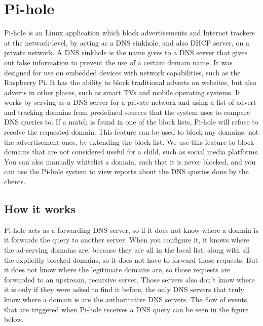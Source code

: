 \section{Pi-hole}

Pi-hole is an Linux application which block advertisements and Internet trackers at the network-level, by acting as a DNS sinkhole, and also DHCP server, on a private network. A DNS sinkhole is the name gives to a DNS server that gives out false information to prevent the use of a certain domain name. It was designed for use on embedded devices with network capabilities, such as the Raspberry Pi. It has the ability to block traditional adverts on websites, but also adverts in other places, such as smart TVs and mobile operating systems. It works by serving as a DNS server for a private network and using a list of advert and tracking domains from predefined sources that the system uses to compare DNS queries to. \parencite{salmela2015pihole} If a match is found in one of the block lists, Pi-hole will refuse to resolve the requested domain. This feature can be used to block any domains, not the advertisement ones, by extending the block list. We use this feature to block domains that are not considered useful for a child, such as social media platforms. You can also manually whitelist a domain, such that it is never blocked, and you can use the Pi-hole system to view reports about the DNS queries done by the clients.

\subsection{How it works}

Pi-hole acts as a forwarding DNS server, so if it does not know where a domain is it forwards the query to another server. When you configure it, it knows where the ad-serving domains are, because they are all in the local list, along with all the explicitly blocked domains, so it does not have to forward those requests. But it does not know where the legitimate domains are, so those requests are forwarded to an upstream, recursive server. Those servers also don't know where it is only if they were asked to find it before, the only DNS servers that truly know where a domain is are the authoritative DNS servers. The flow of events that are triggered when Pi-hole receives a DNS query can be seen in the figure below.\parencite{salmela2017ftldns}

